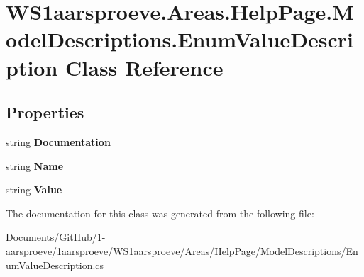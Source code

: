 \hypertarget{class_w_s1aarsproeve_1_1_areas_1_1_help_page_1_1_model_descriptions_1_1_enum_value_description}{}\section{W\+S1aarsproeve.\+Areas.\+Help\+Page.\+Model\+Descriptions.\+Enum\+Value\+Description Class Reference}
\label{class_w_s1aarsproeve_1_1_areas_1_1_help_page_1_1_model_descriptions_1_1_enum_value_description}
\subsection*{Properties}
\begin{DoxyCompactItemize}
\item 
\hypertarget{class_w_s1aarsproeve_1_1_areas_1_1_help_page_1_1_model_descriptions_1_1_enum_value_description_a27958d14638e74e7f95caac4e70586a1}{}string {\bfseries Documentation}\label{class_w_s1aarsproeve_1_1_areas_1_1_help_page_1_1_model_descriptions_1_1_enum_value_description_a27958d14638e74e7f95caac4e70586a1}

\item 
\hypertarget{class_w_s1aarsproeve_1_1_areas_1_1_help_page_1_1_model_descriptions_1_1_enum_value_description_a9c3304e6dc6b0e9885a612c523fd4c43}{}string {\bfseries Name}\label{class_w_s1aarsproeve_1_1_areas_1_1_help_page_1_1_model_descriptions_1_1_enum_value_description_a9c3304e6dc6b0e9885a612c523fd4c43}

\item 
\hypertarget{class_w_s1aarsproeve_1_1_areas_1_1_help_page_1_1_model_descriptions_1_1_enum_value_description_a7329deaef785f63231e0c0b149c9a17c}{}string {\bfseries Value}\label{class_w_s1aarsproeve_1_1_areas_1_1_help_page_1_1_model_descriptions_1_1_enum_value_description_a7329deaef785f63231e0c0b149c9a17c}

\end{DoxyCompactItemize}


The documentation for this class was generated from the following file\+:\begin{DoxyCompactItemize}
\item 
Documents/\+Git\+Hub/1-\/aarsproeve/1aarsproeve/\+W\+S1aarsproeve/\+Areas/\+Help\+Page/\+Model\+Descriptions/Enum\+Value\+Description.\+cs\end{DoxyCompactItemize}
